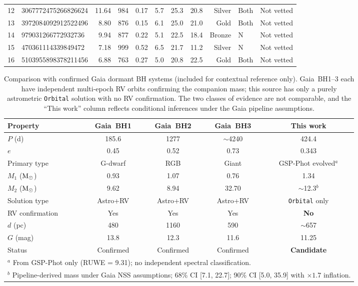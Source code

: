 \documentclass[usenatbib,fleqn]{mnras}
\newcommand{\Msun}{{\rm M}_\odot}
\begin{document}
\begin{table}
\begin{tabular}{rlrrrrrrrll}
12 & 3067772475266826624 & 11.64 & 984 & 0.17 & 5.7 & 25.3 & 20.8 & Silver & Both & Not vetted \\
13 & 3972084092912522496 & 8.80 & 876 & 0.15 & 6.1 & 25.0 & 21.0 & Gold & Both & Not vetted \\
14 & 979031266772932736  & 9.94 & 877 & 0.22 & 5.1 & 22.5 & 18.4 & Bronze & N & Not vetted \\
15 & 470361114339849472  & 7.18 & 999 & 0.52 & 6.5 & 21.7 & 11.2 & Silver & N & Not vetted \\
16 & 5103955898378211456 & 6.88 & 763 & 0.27 & 5.0 & 20.8 & 22.5 & Gold & Both & Not vetted \\
\bottomrule
\end{tabular}
\end{table}

\begin{table}
\centering
\caption{Comparison with confirmed Gaia dormant BH systems
(included for contextual reference only).
Gaia~BH1--3 each have independent multi-epoch RV orbits confirming
the companion mass; this source has only a purely astrometric
\texttt{Orbital} solution with no RV confirmation.  The two classes
of evidence are not comparable, and the ``This work'' column
reflects conditional inferences under the Gaia pipeline assumptions.}
\label{tab:comparison}
\begin{tabular}{lcccc}
\toprule
Property & Gaia~BH1 & Gaia~BH2 & Gaia~BH3 & This work \\
\midrule
$P$ (d)             & 185.6     & 1277      & $\sim$4240      & 424.4   \\
$e$                 & 0.45      & 0.52      & 0.73            & 0.343   \\
Primary type        & G-dwarf   & RGB       & Giant           & GSP-Phot evolved$^a$ \\
$M_1$ ($\Msun$)     & 0.93      & 1.07      & 0.76            & 1.34    \\
$M_2$ ($\Msun$)     & 9.62      & 8.94      & 32.70           & $\sim$12.3$^b$ \\
Solution type       & Astro+RV  & Astro+RV  & Astro+RV        & \texttt{Orbital} only \\
RV confirmation     & Yes       & Yes       & Yes             & \textbf{No} \\
$d$ (pc)            & 480       & 1160      & 590             & $\sim$657 \\
$G$ (mag)           & 13.8      & 12.3      & 11.6            & 11.25   \\
Status              & Confirmed & Confirmed & Confirmed       & \textbf{Candidate} \\
\bottomrule
\multicolumn{5}{l}{$^a$ From GSP-Phot only (RUWE = 9.31);
  no independent spectral classification.}\\
\multicolumn{5}{l}{$^b$ Pipeline-derived mass under Gaia NSS
  assumptions; 68\% CI [7.1, 22.7]; 90\% CI [5.0, 35.9]
  with $\times 1.7$ inflation.}\\
\end{tabular}
\end{table}
\end{document}
